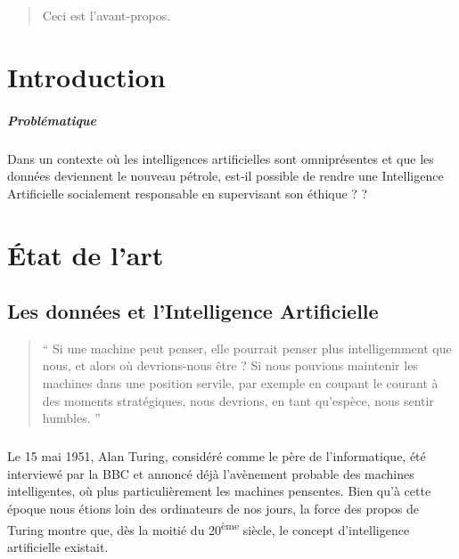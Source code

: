 \documentclass[10pt, french, a4paper]{report}
\begin{document}
\newpage
\setcounter{tocdepth}{3}
\tableofcontents

\newpage
\begin{abstract}

    Ceci est l'avant-propos.

\end{abstract}


\newpage
\chapter*{Introduction}

\paragraph{Problématique} 
Dans un contexte où les intelligences artificielles sont omniprésentes et que les données deviennent le nouveau pétrole, est-il possible de rendre une Intelligence Artificielle socialement responsable en supervisant son éthique ? ?


\chapter{\uppercase{é}tat de l'art}
\label{chap:etat_art}

\section{Les données et l'Intelligence Artificielle}
\label{sec:ia}

\begin{quotation}
  `` Si une machine peut penser, elle pourrait penser plus intelligemment que nous, et alors où devrions-nous être ? Si nous pouvions maintenir les machines dans une position servile, par exemple en coupant le courant à des moments stratégiques, nous devrions, en tant qu'espèce, nous sentir humbles. ''
\end{quotation}

\paragraph{}
Le 15 mai 1951, Alan Turing, considéré comme le père de l'informatique, été interviewé par la BBC et annoncé déjà l'avènement probable des machines intelligentes, où plus particulièrement les machines pensentes. Bien qu'à cette époque nous étions loin des ordinateurs de nos jours, la force des propos de Turing montre que, dès la moitié du 20\textsuperscript{ème} siècle, le concept d'intelligence artificielle existait.
\end{document}
